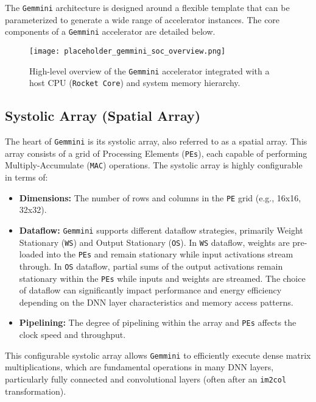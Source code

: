 The \texttt{Gemmini} architecture is designed around a flexible template that can be parameterized to generate a wide range of accelerator instances. The core components of a \texttt{Gemmini} accelerator are detailed below.

\begin{figure}[h!]
    \centering
    \texttt{[image: placeholder\_gemmini\_soc\_overview.png]}
    \caption{High-level overview of the \texttt{Gemmini} accelerator integrated with a host CPU (\texttt{Rocket Core}) and system memory hierarchy.}
    \label{fig:gemmini_soc_overview}
\end{figure}

\subsection{Systolic Array (Spatial Array)}
\label{subsec:gemmini_systolic_array}
The heart of \texttt{Gemmini} is its systolic array, also referred to as a spatial array. This array consists of a grid of Processing Elements (\texttt{PEs}), each capable of performing Multiply-Accumulate (\texttt{MAC}) operations. The systolic array is highly configurable in terms of:
\begin{itemize}
    \item \textbf{Dimensions:} The number of rows and columns in the \texttt{PE} grid (e.g., 16x16, 32x32).
    \item \textbf{Dataflow:} \texttt{Gemmini} supports different dataflow strategies, primarily Weight Stationary (\texttt{WS}) and Output Stationary (\texttt{OS}). In \texttt{WS} dataflow, weights are pre-loaded into the \texttt{PEs} and remain stationary while input activations stream through. In \texttt{OS} dataflow, partial sums of the output activations remain stationary within the \texttt{PEs} while inputs and weights are streamed. The choice of dataflow can significantly impact performance and energy efficiency depending on the DNN layer characteristics and memory access patterns.
    \item \textbf{Pipelining:} The degree of pipelining within the array and \texttt{PEs} affects the clock speed and throughput.
\end{itemize}
This configurable systolic array allows \texttt{Gemmini} to efficiently execute dense matrix multiplications, which are fundamental operations in many DNN layers, particularly fully connected and convolutional layers (often after an \texttt{im2col} transformation).

